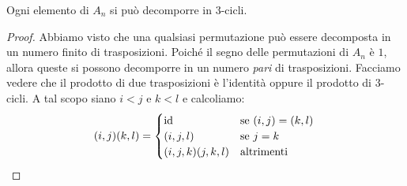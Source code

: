 \begin{prop}
Ogni elemento di $A_n$ si può decomporre in $3$-cicli.
\end{prop}

\begin{proof}
Abbiamo visto che una qualsiasi permutazione può essere decomposta in un numero finito di trasposizioni. Poiché il segno delle permutazioni di $A_n$ è $1$, allora queste si possono decomporre in un numero {\em pari} di trasposizioni. Facciamo vedere che il prodotto di due trasposizioni è l'identità oppure il prodotto di $3$-cicli. A tal scopo siano $i < j$ e $k < l$ e calcoliamo:
\[(i, j)(k, l) = \begin{cases} \mathrm{id} & \text{se } (i, j) = (k, l) \\ (i, j, l) & \text{se } j = k \\ (i, j, k) (j, k, l) & \text{altrimenti} \end{cases} \qedhere\]
\end{proof}

